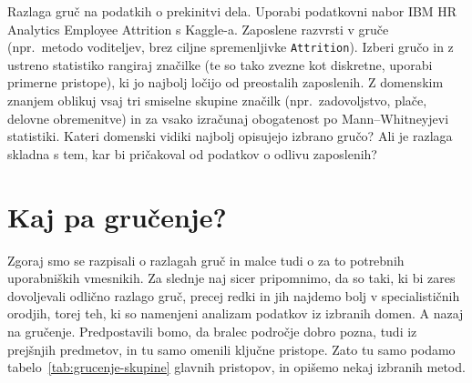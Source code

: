 \begin{exercise}{Razlaga gruč na podatkih o prekinitvi dela.}
  Uporabi podatkovni nabor IBM HR Analytics Employee Attrition s Kaggle-a. Zaposlene razvrsti v gruče (npr.\ metodo voditeljev, brez ciljne spremenljivke \texttt{Attrition}). Izberi gručo in z ustreno statistiko rangiraj značilke (te so tako zvezne kot diskretne, uporabi primerne pristope), ki jo najbolj ločijo od preostalih zaposlenih. Z domenskim znanjem oblikuj vsaj tri smiselne skupine značilk (npr.\ zadovoljstvo, plače, delovne obremenitve) in za vsako izračunaj obogatenost po Mann--Whitneyjevi statistiki. Kateri domenski vidiki najbolj opisujejo izbrano gručo? Ali je razlaga skladna s tem, kar bi pričakoval od podatkov o odlivu zaposlenih?
\end{exercise}  

\section{Kaj pa gručenje?}

Zgoraj smo se razpisali o razlagah gruč in malce tudi o za to potrebnih uporabniških vmesnikih. Za slednje naj sicer pripomnimo, da so taki, ki bi zares dovoljevali odlično razlago gruč, precej redki in jih najdemo bolj v specialističnih orodjih, torej teh, ki so namenjeni analizam podatkov iz izbranih domen. A nazaj na gručenje. Predpostavili bomo, da bralec področje dobro pozna, tudi iz prejšnjih predmetov, in tu samo omenili ključne pristope. Zato tu samo podamo tabelo~\ref{tab:grucenje-skupine} glavnih pristopov, in opišemo nekaj izbranih metod.

